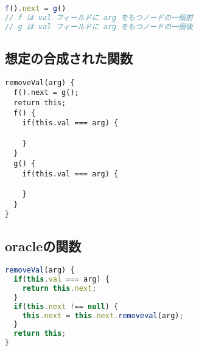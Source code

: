 \documentclass{article}
\begin{document}
\begin{lstlisting}[language=JavaScript]
f().next = g()
// f は val フィールドに arg をもつノードの一個前
// g は val フィールドに arg をもつノードの一個後
\end{lstlisting}

\subsection{想定の合成された関数}
\begin{lstlisting}
removeVal(arg) {
  f().next = g();
  return this;
  f() {
    if(this.val === arg) {
      
    }
  }
  g() {
    if(this.val === arg) {
    
    }
  }
}
\end{lstlisting}

\subsection{oracleの関数}
\begin{lstlisting}[language=JavaScript]
removeVal(arg) {
  if(this.val === arg) {
    return this.next;
  }
  if(this.next !== null) {
    this.next = this.next.removeval(arg);
  }
  return this;
}
\end{lstlisting}














\end{document}

